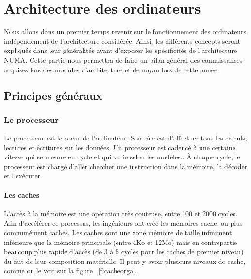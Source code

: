\chapter{Architecture des ordinateurs}

  \lettrine[nindent=0em,lines=3]{N} ous allons dans un premier temps revenir sur
  le fonctionnement des ordinateurs indépendement de l'architecture
  considérée. Ainsi, les différents concepts seront expliqués dans leur
  généralités avant d'exposer les spécificités de l'architecture NUMA. Cette
  partie nous permettra de faire un bilan général des connaissances acquises
  lors des modules d'architecture et de noyau lors de cette année.


  \section{Principes généraux}

    \subsection{Le processeur}

    Le processeur est le coeur de l'ordinateur.  Son rôle est d'effectuer tous
    les calculs, lectures et écritures sur les données. Un processeur est
    cadencé à une certaine vitesse qui se mesure en cycle et qui varie selon les
    modèles.. À chaque cycle, le processeur est chargé d'aller chercher une
    instruction dans la mémoire, la décoder et l'exécuter.

    \subsubsection{Les caches}

      L'accès à la mémoire est une opération très couteuse, entre 100 et 2000
      cycles\cite{Lepers2014}. Afin d'accélérer ce processus, les ingénieurs ont
      créé les mémoires cache, ou plus communément caches. Les caches sont une
      zone mémoire de taille infiniment inférieure que la mémoire principale
      (entre 4Ko et 12Mo) mais en contrepartie beaucoup plus rapide d'accès (de
      3 à 5 cycles pour les caches de premier niveau) du fait de leur
      composition matérielle. Il peut y avoir plusieurs niveaux de cache, comme
      on le voit sur la figure ~\ref{f:cacheorga}.


